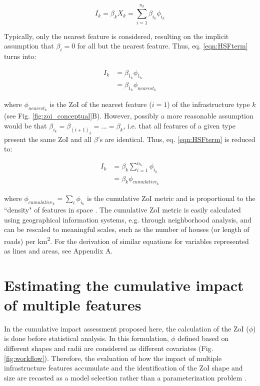 \documentclass[titlepage]{article}
\begin{document}
\begin{equation}
\label{eqn:HSFterm}
    I_k = \beta_k X_k = \sum_{i=1}^{n_k} \beta_{i_k} \phi_{i_k}
\end{equation}

Typically, only the nearest feature is considered, resulting on the implicit assumption that $\beta_i = 0$ for all but the nearest feature. Thus, eq. \ref{eqn:HSFterm} turns into:

\begin{equation}
\label{eqn:HSFnearest}
\begin{split}
    I_k & = \beta_{1_k} \phi_{1_k} \\
        & = \beta_{1_k} \phi_{nearest_k}
\end{split}                
\end{equation}

where $\phi_{nearest_k}$ is the ZoI of the nearest feature ($i = 1$) of the infrastructure type $k$ (see Fig. \ref{fig:zoi_conceptual}B). However, possibly a more reasonable assumption would be that $\beta_{i_k} = \beta_{{(i+1)}_k} = ... = \beta_k$, i.e. that all features of a given type present the same ZoI and all $\beta$'s are identical. Thus, eq. \ref{eqn:HSFterm} is reduced to:

\begin{equation}
\label{eqn:HSFcuminf}
\begin{split}
    I_k & = \beta_k \sum_{i=1}^{n_k} \phi_{i_k} \\
        & = \beta_k \phi_{cumulative_k}
\end{split}
\end{equation}

where $\phi_{cumulative_k} = \sum_{i} \phi_{i_k}$ is the cumulative ZoI metric and is proportional to 
the ``density" of features in space \citep[e.g.][]{panzacchi_searching_2015}. The cumulative ZoI metric is easily calculated using geographical information systems, e.g. through neighborhood analysis, and can be rescaled to meaningful scales, such as the number of houses (or length of roads) per km\textsuperscript{2}. For the derivation of similar equations for variables represented as lines and areas, see Appendix A.

\section{Estimating the cumulative impact of multiple features}

In the cumulative impact assessment proposed here, the calculation of the ZoI ($\phi$) is done before statistical analysis. In this formulation, $\phi$ defined based on different shapes and radii are considered as different covariates (Fig. \ref{fig:workflow}). Therefore, the evaluation of how the impact of multiple infrastructure features accumulate and the identification of the ZoI shape and size are recasted as a model selection rather than a parameterization problem \citep[such as in][]{lee_estimating_2020}.
\end{document}
